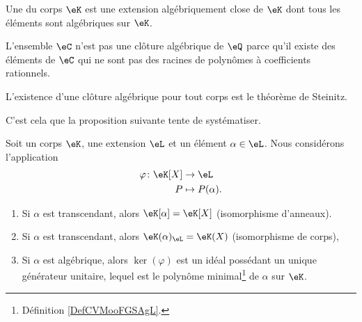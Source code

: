 Une  du corps \( \eK\) est une extension algébriquement close de \( \eK\) dont tous les éléments sont algébriques sur \( \eK\).

\begin{remark}
    L'ensemble \( \eC\) n'est pas une clôture algébrique de \( \eQ\) parce qu'il existe des éléments de \( \eC\) qui ne sont pas des racines de polynômes à coefficients rationnels.
\end{remark}
L'existence d'une clôture algébrique pour tout corps est le théorème de Steinitz.

C'est cela que la proposition suivante tente de systématiser.
\begin{proposition}     \label{PROPooSYQWooFbfQtm}
    Soit un corps \( \eK\), une extension \( \eL\) et un élément \( \alpha\in \eL\). Nous considérons l'application
    \begin{equation}
        \begin{aligned}
            \varphi\colon \eK[X]&\to \eL \\
            P&\mapsto P(\alpha). 
        \end{aligned}
    \end{equation}
    \begin{enumerate}
        \item       \label{ITEMooUZDQooOasiRQ}
            Si \( \alpha\) est transcendant, alors \( \eK[\alpha]=\eK[X]\) (isomorphisme d'anneaux).
        \item
            Si \( \alpha\) est transcendant, alors \( \eK(\alpha)_{\eL}=\eK(X)\) (isomorphisme de corps),
        \item
            Si \( \alpha\) est algébrique, alors \( \ker(\varphi)\) est un idéal possédant un unique générateur unitaire, lequel est le polynôme minimal\footnote{Définition \ref{DefCVMooFGSAgL}.} de \( \alpha\) sur \( \eK\).
    \end{enumerate}
\end{proposition}

